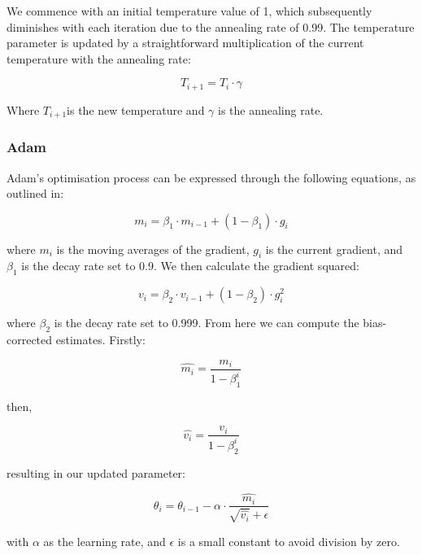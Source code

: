 \documentclass[twocolumn, aps, pra]{revtex4-2}
\begin{document}
	We commence with an initial temperature value of 1, which subsequently diminishes with each iteration due to the annealing rate of 0.99. The temperature parameter is updated by a straightforward multiplication of the current temperature with the annealing rate:
	
	\begin{equation}
		T_{i+1} = T_i \cdot \gamma
	\end{equation}
	
	Where $T_{i+1}$is the new temperature and $\gamma$ is the annealing rate.
	
	\subsubsection{Adam}
	Adam's optimisation process can be expressed through the following equations, as outlined in\cite{adam}:
	
	\begin{equation}
		m_i = \beta_1 \cdot m_{i-1} + (1 - \beta_1) \cdot g_i \label{eq:mo}
	\end{equation}
	
	where $m_i$ is the moving averages of the gradient, $g_i$ is the current gradient, and $\beta_1$ is the decay rate set to 0.9. We then calculate the gradient squared:
	
	\begin{equation}
		v_i = \beta_2 \cdot v_{i-1} + (1 - \beta_2) \cdot g_i^2
	\end{equation}
	
	where $\beta_2$ is the decay rate set to 0.999. From here we can compute the bias-corrected estimates. Firstly:
	
	\begin{equation}
		\hat{m_i} = \frac{m_i}{1 - \beta_1^i}
	\end{equation}
	
	then,
	
	\begin{equation}
		\hat{v_i} = \frac{v_i}{1 - \beta_2^i}
	\end{equation}
	
	resulting in our updated parameter:
	
	\begin{equation}
		\theta_i = \theta_{i-1} - \alpha \cdot \frac{\hat{m_i}}{\sqrt{\hat{v_i}} + \epsilon}
	\end{equation}
	
	with $\alpha$ as the learning rate, and $\epsilon$ is a small constant to avoid division by zero.
	
\end{document}
